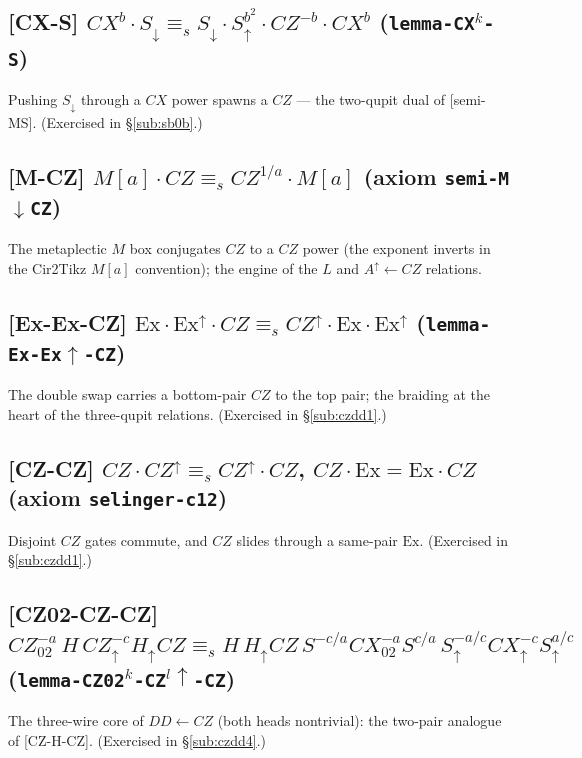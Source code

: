 \documentclass[a4paper]{article}
\newcommand{\lem}[1]{\textsf{[#1]}}      %
\begin{document}
\subsection*{\lem{CX-S} \; $CX^{b}\cdot S_\downarrow \equiv_s S_\downarrow\cdot S^{b^2}_\uparrow\cdot CZ^{-b}\cdot CX^{b}$ \hfill (\texttt{lemma-CX$^{k}$-S})}
Pushing $S_\downarrow$ through a $CX$ power spawns a $CZ$ --- the two-qupit dual of \lem{semi-MS}. (Exercised in \S\ref{sub:sb0b}.)

\subsection*{\lem{M-CZ} \; $M[a]\cdot CZ \equiv_s CZ^{1/a}\cdot M[a]$ \hfill (axiom \texttt{semi-M$\downarrow$CZ})}
The metaplectic $M$ box conjugates $CZ$ to a $CZ$ power (the exponent inverts in the Cir2Tikz $M[a]$ convention); the engine of the $L$ and $A^{\uparrow}\!\leftarrow CZ$ relations.

\subsection*{\lem{Ex-Ex-CZ} \; $\mathrm{Ex}\cdot\mathrm{Ex}^{\uparrow}\cdot CZ \equiv_s CZ^{\uparrow}\cdot\mathrm{Ex}\cdot\mathrm{Ex}^{\uparrow}$ \hfill (\texttt{lemma-Ex-Ex$\uparrow$-CZ})}
The double swap carries a bottom-pair $CZ$ to the top pair; the braiding at the heart of the three-qupit relations. (Exercised in \S\ref{sub:czdd1}.)

\subsection*{\lem{CZ-CZ} \; $CZ\cdot CZ^{\uparrow} \equiv_s CZ^{\uparrow}\cdot CZ$, \quad $CZ\cdot\mathrm{Ex}=\mathrm{Ex}\cdot CZ$ \hfill (axiom \texttt{selinger-c12})}
Disjoint $CZ$ gates commute, and $CZ$ slides through a same-pair $\mathrm{Ex}$. (Exercised in \S\ref{sub:czdd1}.)

\subsection*{\lem{CZ02-CZ-CZ} \; $CZ_{02}^{-a}\,H\,CZ^{-c}_\uparrow H_\uparrow CZ \equiv_s H\,H_\uparrow CZ\,S^{-c/a}CX_{02}^{-a}S^{c/a}\,S^{-a/c}_\uparrow CX^{-c}_\uparrow S^{a/c}_\uparrow$ \hfill (\texttt{lemma-CZ02$^{k}$-CZ$^{l}\uparrow$-CZ})}
The three-wire core of $DD\leftarrow CZ$ (both heads nontrivial): the two-pair analogue of \lem{CZ-H-CZ}. (Exercised in \S\ref{sub:czdd4}.)
\end{document}
